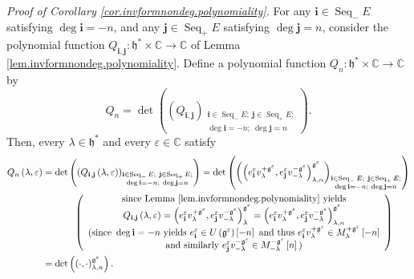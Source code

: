 \documentclass[etingof-lie.tex]{subfiles}
\begin{document}
\textit{Proof of Corollary \ref{cor.invformnondeg.polynomiality}.} For any
$\mathbf{i}\in\operatorname*{Seq}\nolimits_{-}E$ satisfying $\deg
\mathbf{i}=-n$, and any $\mathbf{j}\in\operatorname*{Seq}\nolimits_{+}E$
satisfying $\deg\mathbf{j}=n$, consider the polynomial function $Q_{\mathbf{i}%
,\mathbf{j}}:\mathfrak{h}^{\ast}\times\mathbb{C}\rightarrow\mathbb{C}$ of
Lemma \ref{lem.invformnondeg.polynomiality}. Define a polynomial function
$Q_{n}:\mathfrak{h}^{\ast}\times\mathbb{C}\rightarrow\mathbb{C}$ by%
\[
Q_{n}=\det\left(  \left(  Q_{\mathbf{i},\mathbf{j}}\right)
_{\substack{\mathbf{i}\in\operatorname*{Seq}\nolimits_{-}E;\ \mathbf{j}%
\in\operatorname*{Seq}\nolimits_{+}E;\\\deg\mathbf{i}=-n;\ \deg\mathbf{j}%
=n}}\right)  .
\]
Then, every $\lambda\in\mathfrak{h}^{\ast}$ and every $\varepsilon
\in\mathbb{C}$ satisfy%
\begin{align*}
Q_{n}\left(  \lambda,\varepsilon\right)   &  =\det\left(  \left(
Q_{\mathbf{i},\mathbf{j}}\left(  \lambda,\varepsilon\right)  \right)
_{\substack{\mathbf{i}\in\operatorname*{Seq}\nolimits_{-}E;\ \mathbf{j}%
\in\operatorname*{Seq}\nolimits_{+}E;\\\deg\mathbf{i}=-n;\ \deg\mathbf{j}%
=n}}\right)  =\det\left(  \left(  \left(  e_{\mathbf{i}}^{\varepsilon
}v_{\lambda}^{+\mathfrak{g}^{\varepsilon}},e_{\mathbf{j}}^{\varepsilon
}v_{-\lambda}^{-\mathfrak{g}^{\varepsilon}}\right)  _{\lambda,n}%
^{\mathfrak{g}^{\varepsilon}}\right)  _{\substack{\mathbf{i}\in
\operatorname*{Seq}\nolimits_{-}E;\ \mathbf{j}\in\operatorname*{Seq}%
\nolimits_{+}E;\\\deg\mathbf{i}=-n;\ \deg\mathbf{j}=n}}\right) \\
&  \ \ \ \ \ \ \ \ \ \ \left(
\begin{array}
[c]{c}%
\text{since Lemma \ref{lem.invformnondeg.polynomiality} yields}\\
Q_{\mathbf{i},\mathbf{j}}\left(  \lambda,\varepsilon\right)  =\left(
e_{\mathbf{i}}^{\varepsilon}v_{\lambda}^{+\mathfrak{g}^{\varepsilon}%
},e_{\mathbf{j}}^{\varepsilon}v_{-\lambda}^{-\mathfrak{g}^{\varepsilon}%
}\right)  _{\lambda}^{\mathfrak{g}^{\varepsilon}}=\left(  e_{\mathbf{i}%
}^{\varepsilon}v_{\lambda}^{+\mathfrak{g}^{\varepsilon}},e_{\mathbf{j}%
}^{\varepsilon}v_{-\lambda}^{-\mathfrak{g}^{\varepsilon}}\right)  _{\lambda
,n}^{\mathfrak{g}^{\varepsilon}}\\
\text{(since }\deg\mathbf{i}=-n\text{ yields }e_{\mathbf{i}}^{\varepsilon}\in
U\left(  \mathfrak{g}^{\varepsilon}\right)  \left[  -n\right]  \text{ and thus
}e_{\mathbf{i}}^{\varepsilon}v_{\lambda}^{+\mathfrak{g}^{\varepsilon}}\in
M_{\lambda}^{+\mathfrak{g}^{\varepsilon}}\left[  -n\right] \\
\text{and similarly }e_{\mathbf{j}}^{\varepsilon}v_{-\lambda}^{-\mathfrak{g}%
^{\varepsilon}}\in M_{-\lambda}^{-\mathfrak{g}^{\varepsilon}}\left[  n\right]
\text{)}%
\end{array}
\right) \\
&  =\det\left(  \left(  \cdot,\cdot\right)  _{\lambda,n}^{\mathfrak{g}%
^{\varepsilon}}\right)  .
\end{align*}
\end{document}
